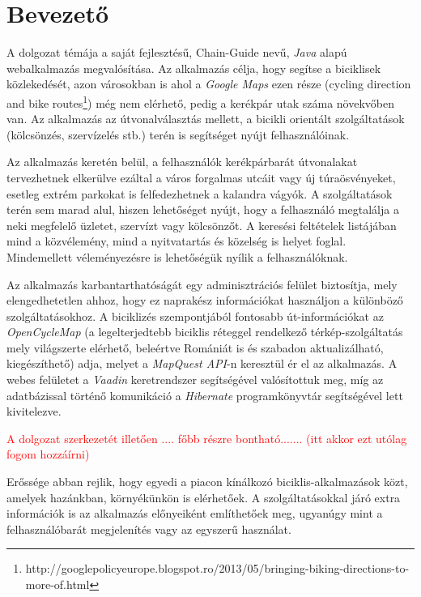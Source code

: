 \chapter{Bevezető}\label{ch:BEVEZET}


\setlength{\parindent}{4em}
\setlength{\parskip}{1em}

 \par	A dolgozat témája a saját fejlesztésű,  Chain-Guide nevű,   \textit{Java} alapú webalkalmazás megvalósítása. Az alkalmazás célja, hogy segítse a biciklisek közlekedését, azon városokban is ahol a  \textit{Google Maps} ezen része  (cycling direction and bike routes\footnote{http://googlepolicyeurope.blogspot.ro/2013/05/bringing-biking-directions-to-more-of.html}) még nem elérhető, pedig a kerékpár utak száma növekvőben van. Az alkalmazás az útvonalválasztás mellett, a bicikli orientált szolgáltatások (kölcsönzés, szervízelés stb.) terén is segítséget nyújt felhasználóinak. 
 \par	Az alkalmazás keretén belül, a felhasználók kerékpárbarát útvonalakat tervezhetnek elkerülve ezáltal a város forgalmas utcáit vagy  új túraösvényeket, esetleg extrém parkokat is felfedezhetnek a kalandra vágyók. A szolgáltatások terén sem marad alul, hiszen lehetőséget nyújt, hogy a felhasználó megtalálja a neki megfelelő üzletet, szervízt vagy kölcsönzőt. A keresési feltételek listájában mind a közvélemény, mind a nyitvatartás és közelség is helyet foglal. Mindemellett véleményezésre is lehetőségük nyílik a felhasználóknak. 
 \par	Az alkalmazás  karbantarthatóságát egy adminisztrációs felület biztosítja, mely elengedhetetlen ahhoz, hogy ez naprakész információkat használjon a különböző szolgáltatásokhoz. A biciklizés szempontjából fontosabb út-információkat az  \textit{OpenCycleMap}\cite{OpenCycleMap} (a legelterjedtebb biciklis réteggel rendelkező térkép-szolgáltatás mely világszerte elérhető, beleértve Romániát is és szabadon aktualizálható, kiegészíthető) adja, melyet a  \textit{MapQuest API}\cite{MapQuestJsApi}-n keresztül ér el az alkalmazás. A webes felületet a  \textit{Vaadin}\cite{Vaadin}  keretrendszer segítségével valósítottuk meg, míg az adatbázissal történő komunikáció a  \textit{Hibernate}\cite{Hibernate} programkönyvtár segítségével lett kivitelezve. 
 \par	\textcolor{red}{A dolgozat szerkezetét illetően .... főbb részre bontható.......
		(itt akkor ezt utólag fogom hozzáírni)}





 \par	Erőssége abban rejlik, hogy egyedi a piacon kínálkozó biciklis-alkalmazások közt, amelyek hazánkban, környékünkön is elérhetőek. A szolgáltatásokkal járó extra információk is az alkalmazás előnyeiként említhetőek meg, ugyanúgy mint a felhasználóbarát megjelenítés vagy az egyszerű használat. 

